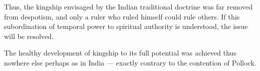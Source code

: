 Thus, the kingship envisaged by the Indian traditional doctrine was far removed from despotism, and only a ruler who ruled himself could rule others.  If this subordination of temporal power to spiritual authority is understood, the issue will be resolved.  

The healthy development of kingship to its full potential was achieved thus nowhere else perhaps as in India --- exactly contrary to the contention of Pollock.

\theendnotes
